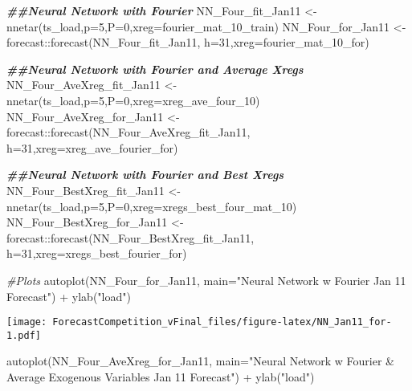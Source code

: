 \documentclass[
]{article}
\newenvironment{Shaded}{\begin{snugshade}}{\end{snugshade}}
\newcommand{\AttributeTok}[1]{\textcolor[rgb]{0.77,0.63,0.00}{#1}}
\newcommand{\CommentTok}[1]{\textcolor[rgb]{0.56,0.35,0.01}{\textit{#1}}}
\newcommand{\DecValTok}[1]{\textcolor[rgb]{0.00,0.00,0.81}{#1}}
\newcommand{\DocumentationTok}[1]{\textcolor[rgb]{0.56,0.35,0.01}{\textbf{\textit{#1}}}}
\newcommand{\FunctionTok}[1]{\textcolor[rgb]{0.00,0.00,0.00}{#1}}
\newcommand{\NormalTok}[1]{#1}
\newcommand{\OtherTok}[1]{\textcolor[rgb]{0.56,0.35,0.01}{#1}}
\newcommand{\SpecialCharTok}[1]{\textcolor[rgb]{0.00,0.00,0.00}{#1}}
\newcommand{\StringTok}[1]{\textcolor[rgb]{0.31,0.60,0.02}{#1}}
\begin{document}
\begin{Shaded}
\begin{Highlighting}[]
\DocumentationTok{\#\#Neural Network with Fourier}
\NormalTok{NN\_Four\_fit\_Jan11 }\OtherTok{\textless{}{-}} \FunctionTok{nnetar}\NormalTok{(ts\_load,}\AttributeTok{p=}\DecValTok{5}\NormalTok{,}\AttributeTok{P=}\DecValTok{0}\NormalTok{,}\AttributeTok{xreg=}\NormalTok{fourier\_mat\_10\_train)}
\NormalTok{NN\_Four\_for\_Jan11 }\OtherTok{\textless{}{-}}\NormalTok{ forecast}\SpecialCharTok{::}\FunctionTok{forecast}\NormalTok{(NN\_Four\_fit\_Jan11, }\AttributeTok{h=}\DecValTok{31}\NormalTok{,}\AttributeTok{xreg=}\NormalTok{fourier\_mat\_10\_for)}

\DocumentationTok{\#\#Neural Network with Fourier and Average Xregs}
\NormalTok{NN\_Four\_AveXreg\_fit\_Jan11 }\OtherTok{\textless{}{-}} \FunctionTok{nnetar}\NormalTok{(ts\_load,}\AttributeTok{p=}\DecValTok{5}\NormalTok{,}\AttributeTok{P=}\DecValTok{0}\NormalTok{,}\AttributeTok{xreg=}\NormalTok{xreg\_ave\_four\_10)}
\NormalTok{NN\_Four\_AveXreg\_for\_Jan11 }\OtherTok{\textless{}{-}}\NormalTok{ forecast}\SpecialCharTok{::}\FunctionTok{forecast}\NormalTok{(NN\_Four\_AveXreg\_fit\_Jan11, }\AttributeTok{h=}\DecValTok{31}\NormalTok{,}\AttributeTok{xreg=}\NormalTok{xreg\_ave\_fourier\_for)}

\DocumentationTok{\#\#Neural Network with Fourier and Best Xregs}
\NormalTok{NN\_Four\_BestXreg\_fit\_Jan11 }\OtherTok{\textless{}{-}} \FunctionTok{nnetar}\NormalTok{(ts\_load,}\AttributeTok{p=}\DecValTok{5}\NormalTok{,}\AttributeTok{P=}\DecValTok{0}\NormalTok{,}\AttributeTok{xreg=}\NormalTok{xregs\_best\_four\_mat\_10)}
\NormalTok{NN\_Four\_BestXreg\_for\_Jan11 }\OtherTok{\textless{}{-}}\NormalTok{ forecast}\SpecialCharTok{::}\FunctionTok{forecast}\NormalTok{(NN\_Four\_BestXreg\_fit\_Jan11, }\AttributeTok{h=}\DecValTok{31}\NormalTok{,}\AttributeTok{xreg=}\NormalTok{xregs\_best\_fourier\_for)}

\CommentTok{\#Plots}
\FunctionTok{autoplot}\NormalTok{(NN\_Four\_for\_Jan11, }\AttributeTok{main=}\StringTok{"Neural Network w Fourier Jan \textquotesingle{}11 Forecast"}\NormalTok{) }\SpecialCharTok{+} \FunctionTok{ylab}\NormalTok{(}\StringTok{"load"}\NormalTok{) }
\end{Highlighting}
\end{Shaded}

\texttt{[image: ForecastCompetition\_vFinal\_files/figure-latex/NN\_Jan11\_for-1.pdf]}

\begin{Shaded}
\begin{Highlighting}[]
\FunctionTok{autoplot}\NormalTok{(NN\_Four\_AveXreg\_for\_Jan11, }\AttributeTok{main=}\StringTok{"Neural Network w Fourier \& Average Exogenous Variables Jan \textquotesingle{}11 Forecast"}\NormalTok{) }\SpecialCharTok{+} \FunctionTok{ylab}\NormalTok{(}\StringTok{"load"}\NormalTok{) }
\end{Highlighting}
\end{Shaded}
\end{document}
